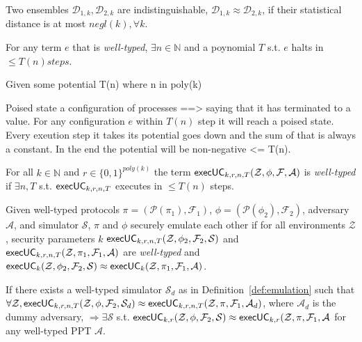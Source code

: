\begin{definition}\label{def:distance}
Two ensembles $\mathcal{D}_{1,k}, \mathcal{D}_{2,k}$ are indistinguishable, $\mathcal{D}_{1,k} \approx \mathcal{D}_{2,k}$, if their statistical distance is at most $negl(k), \forall k$.
\end{definition}

\begin{definition}
For any term $e$ that is \textit{well-typed}, $\exists n \in \mathbb{N}$ and a poynomial $T$ s.t. $e$ halts in $\leq T(n) steps$.

Given some potential T(n) where n in poly(k) 

Poised state a configuration of processes ==> saying that it has terminated to a value. For any configuration $e$ within $T(n)$ step it will reach a poised state.
Every exeution step it takes its potential goes down and the sum of that is always a constant. 
In the end the potential will be non-negative <= T(n).

\end{definition}

\begin{definition}
For all $k \in \mathbb{N}$ and $r \in \{0,1\}^{poly(k)}$ the term ${\mathsf {execUC}}_{k,r,n,T}(\mathcal{Z}, \phi, \mathcal{F}, \mathcal{A})$ is \textit{well-typed} if $\exists n, T$ s.t. ${\mathsf {execUC}}_{k,r,n,T}$ executes in $\leq T(n)$ steps.
\end{definition}

\begin{definition}\label{def:emulation}
Given well-typed protocols $\pi = (\mathcal{P}(\pi_1), \mathcal{F}_1)$, $\phi = (\mathcal{P}(\phi_2), \mathcal{F}_2)$, adversary $\mathcal{A}$, and simulator $\mathcal{S}$, $\pi$ and $\phi$ securely emulate each other if for all environments $\mathcal{Z}$, security parameters $k$ ${\mathsf {execUC}}_{k,r,n,T} (\mathcal{Z}, \phi_2, \mathcal{F}_2, \mathcal{S})$ and  ${\mathsf {execUC}}_{k,r,n,T} (\mathcal{Z}, \pi_1, \mathcal{F}_1, \mathcal{A})$ are \textit{well-typed}  and ${\mathsf {execUC}}_k (\mathcal{Z}, \phi_2, \mathcal{F}_2, \mathcal{S}) \approx {\mathsf {execUC}}_k (\mathcal{Z}, \pi_1, \mathcal{F}_1, \mathcal{A})$.
\end{definition}

\begin{theorem}
If there exists a well-typed  simulator $\mathcal{S}_d$ as in Definition~\ref{def:emulation} such that $\forall \mathcal{Z}, {\mathsf {execUC}}_{k,r,n,T}(\mathcal{Z}, \phi, \mathcal{F}_2, \mathcal{S}_d) \approx {\mathsf {execUC}}_{k,r,n,T}(\mathcal{Z}, \pi, \mathcal{F}_1, \mathcal{A}_d)$, where $\mathcal{A}_d$ is the dummy adversary, $\Rightarrow \exists \mathcal{S}$ s.t. ${\mathsf {execUC}}_{k,r}(\mathcal{Z}, \phi, \mathcal{F}_2, \mathcal{S}) \approx {\mathsf {execUC}}_{k,r}(\mathcal{Z}, \pi, \mathcal{F}_1, \mathcal{A}$ for any well-typed PPT $\mathcal{A}$.
\end{theorem}

\begin{figure}

\end{figure}
